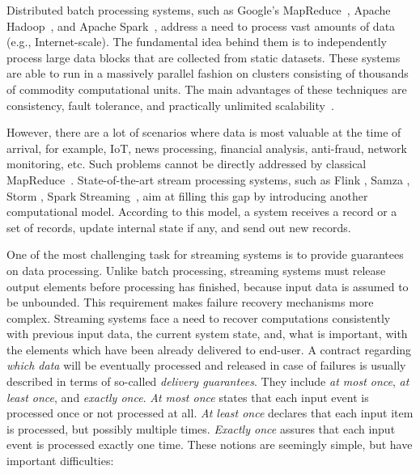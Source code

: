 
\label {fs-intro-seciton}

Distributed batch processing systems, such as Google's MapReduce~\cite{Dean:2008:MSD:1327452.1327492}, Apache Hadoop~\cite{hadoop2009hadoop}, and Apache Spark~\cite{Zaharia:2016:ASU:3013530.2934664}, address a need to process vast amounts of data (e.g., Internet-scale). The fundamental idea behind them is to independently process large data blocks that are collected from static datasets. These systems are able to run in a massively parallel fashion on clusters consisting of thousands of commodity computational units. The main advantages of these techniques are consistency, fault tolerance, and practically unlimited scalability~\cite{borthakur2011apache}.


However, there are a lot of scenarios where data is most valuable at the time of arrival, for example, IoT, news processing, financial analysis, anti-fraud, network monitoring, etc. Such problems cannot be directly addressed by classical MapReduce~\cite{Doulkeridis:2014:SLA:2628707.2628782}. State-of-the-art stream processing systems, such as Flink \cite{carbone2015apache}, Samza \cite{Noghabi:2017:SSS:3137765.3137770}, Storm \cite{apache:storm}, Spark Streaming~\cite{Zaharia:2012:DSE:2342763.2342773}, aim at filling this gap by introducing another computational model. According to this model, a system receives a record or a set of records, update internal state if any, and send out new records. 

One of the most challenging task for streaming systems is to provide guarantees on data processing. Unlike batch processing, streaming systems must release output elements before processing has finished, because input data is assumed to be unbounded. This requirement makes failure recovery mechanisms more complex. Streaming systems face a need to recover computations consistently with previous input data, the current system state, and, what is important, with the elements which have been already delivered to end-user. A contract regarding {\em which data} will be eventually processed and released in case of failures is usually described in terms of so-called {\em delivery guarantees}. They include {\em at most once}, {\em at least once}, and {\em exactly once}. {\it At most once} states that each input event is processed once or not processed at all. {\it At least once} declares that each input item is processed, but possibly multiple times. {\it Exactly once} assures that each input event is processed exactly one time. These notions are seemingly simple, but have important difficulties:

